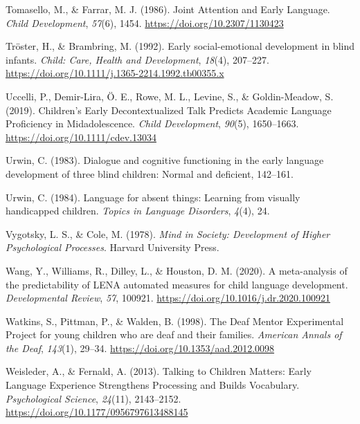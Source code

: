 \documentclass[
  man,floatsintext]{apa6}
\newlength{\cslhangindent}
\newlength{\cslentryspacingunit} %
\newenvironment{CSLReferences}[2] %
 {%
  \setlength{\parindent}{0pt}
  \ifodd #1
  \let\oldpar\par
  \def\par{\hangindent=\cslhangindent\oldpar}
  \fi
  \setlength{\parskip}{#2\cslentryspacingunit}
 }%
 {}
\begin{document}
\begin{CSLReferences}{1}{0}
\leavevmode{}%
Tomasello, M., \& Farrar, M. J. (1986). Joint {Attention} and {Early Language}. \emph{Child Development}, \emph{57}(6), 1454. \url{https://doi.org/10.2307/1130423}

\leavevmode{}%
Tröster, H., \& Brambring, M. (1992). Early social-emotional development in blind infants. \emph{Child: Care, Health and Development}, \emph{18}(4), 207--227. \url{https://doi.org/10.1111/j.1365-2214.1992.tb00355.x}

\leavevmode{}%
Uccelli, P., Demir-Lira, Ö. E., Rowe, M. L., Levine, S., \& Goldin-Meadow, S. (2019). Children's {Early Decontextualized Talk Predicts Academic Language Proficiency} in {Midadolescence}. \emph{Child Development}, \emph{90}(5), 1650--1663. \url{https://doi.org/10.1111/cdev.13034}

\leavevmode{}%
Urwin, C. (1983). Dialogue and cognitive functioning in the early language development of three blind children: {Normal} and deficient, 142--161.

\leavevmode{}%
Urwin, C. (1984). Language for absent things: Learning from visually handicapped children. \emph{Topics in Language Disorders}, \emph{4}(4), 24.

\leavevmode{}%
Vygotsky, L. S., \& Cole, M. (1978). \emph{Mind in {Society}: {Development} of {Higher Psychological Processes}}. {Harvard University Press}.

\leavevmode{}%
Wang, Y., Williams, R., Dilley, L., \& Houston, D. M. (2020). A meta-analysis of the predictability of {LENA}\texttrademark{} automated measures for child language development. \emph{Developmental Review}, \emph{57}, 100921. \url{https://doi.org/10.1016/j.dr.2020.100921}

\leavevmode{}%
Watkins, S., Pittman, P., \& Walden, B. (1998). The {Deaf Mentor Experimental Project} for young children who are deaf and their families. \emph{American Annals of the Deaf}, \emph{143}(1), 29--34. \url{https://doi.org/10.1353/aad.2012.0098}

\leavevmode{}%
Weisleder, A., \& Fernald, A. (2013). Talking to {Children Matters}: {Early Language Experience Strengthens Processing} and {Builds Vocabulary}. \emph{Psychological Science}, \emph{24}(11), 2143--2152. \url{https://doi.org/10.1177/0956797613488145}


\end{CSLReferences}
\end{document}
